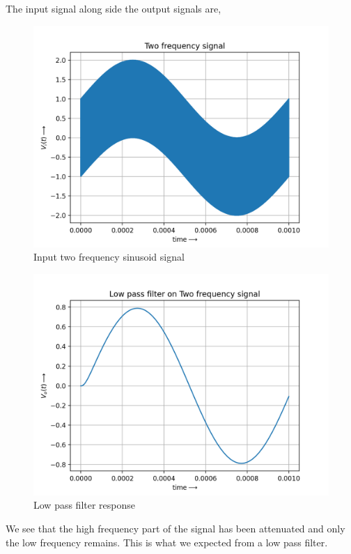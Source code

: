 \documentclass[11pt, a4paper]{article}
\begin{document}
The input signal along side the output signals are,
\begin{figure}[!tbh]
   	\centering
   	\includegraphics[scale=0.5]{two_freq_input.png}   
   	\caption{Input two frequency sinusoid signal}
   	\label{fig:Figure_1}
\end{figure}
\begin{figure}[!tbh]
   	\centering
   	\includegraphics[scale=0.5]{low_pass_tfs.png}   
   	\caption{Low pass filter response}
   	\label{fig:Figure_1}
\end{figure}
We see that the high frequency part of the signal has been attenuated and only the low frequency remains. This is what we expected from a low pass filter.
\end{document}
